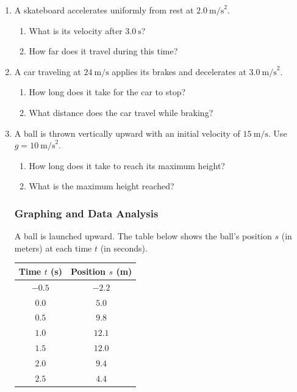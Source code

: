 \documentclass[12pt, twoside]{article}
\begin{document}
\begin{enumerate}[itemsep=0.5cm]
\newpage
\subsubsection*{Kinematics Equations}

\textbf{Formulas:} \quad $v = v_0 + at$ \quad\quad $d = v_0 t + \frac{1}{2}at^2$ \quad\quad $v^2 = v_0^2 + 2ad$ \quad\quad $d = \frac{1}{2}(v_0 + v)t$


\item A skateboard accelerates uniformly from rest at $2.0~\text{m/s}^2$.
  \begin{enumerate}[itemsep=2cm]
    \item What is its velocity after $3.0~\text{s}$?
    \item How far does it travel during this time?
  \end{enumerate}
  \vspace{2cm}

\item A car traveling at $24~\text{m/s}$ applies its brakes and decelerates at $3.0~\text{m/s}^2$.
  \begin{enumerate}[itemsep=3cm]
    \item How long does it take for the car to stop?
    \item What distance does the car travel while braking?
  \end{enumerate}
  \vspace{2cm}

\item A ball is thrown vertically upward with an initial velocity of $15~\text{m/s}$. Use $g = 10~\text{m/s}^2$.
  \begin{enumerate}[itemsep=2cm]
    \item How long does it take to reach its maximum height?
    \item What is the maximum height reached?
  \end{enumerate}

\newpage
\subsubsection*{Graphing and Data Analysis}

A ball is launched upward. The table below shows the ball's position $s$ (in meters) at each time $t$ (in seconds).

\begin{center}
\begin{tabular}{|c|c|}
\hline
\textbf{Time $t$ (s)} & \textbf{Position $s$ (m)} \\
\hline
$-0.5$ & $-2.2$ \\
$0.0$ & $5.0$ \\
$0.5$ & $9.8$ \\
$1.0$ & $12.1$ \\
$1.5$ & $12.0$ \\
$2.0$ & $9.4$ \\
$2.5$ & $4.4$ \\
\hline
\end{tabular}
\end{center}


\end{enumerate}
\end{document}
